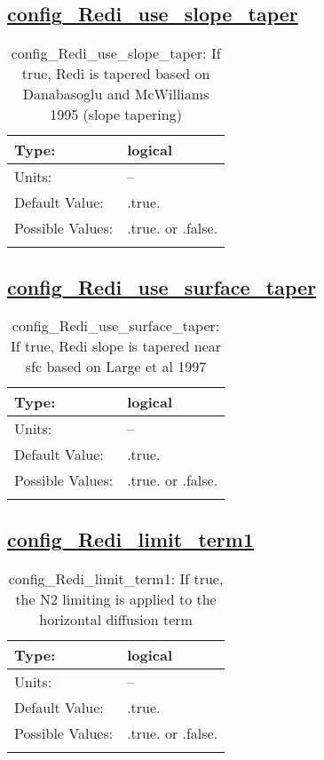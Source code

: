 \subsection[config\_Redi\_use\_slope\_taper]{\hyperref[sec:nm_tab_Redi_isopycnal_mixing]{config\_Redi\_use\_slope\_taper}}
\label{subsec:nm_sec_config_Redi_use_slope_taper}
\begin{center}
\begin{longtable}{| p{2.0in} || p{4.0in} |}
    \hline
    Type: & logical \\
    \hline
    Units: & -- \\
    \hline
    Default Value: & .true. \\
    \hline
    Possible Values: & .true. or .false. \\
    \hline
    \caption{config\_Redi\_use\_slope\_taper: If true, Redi is tapered based on Danabasoglu and McWilliams 1995 (slope tapering)}
\end{longtable}
\end{center}
\subsection[config\_Redi\_use\_surface\_taper]{\hyperref[sec:nm_tab_Redi_isopycnal_mixing]{config\_Redi\_use\_surface\_taper}}
\label{subsec:nm_sec_config_Redi_use_surface_taper}
\begin{center}
\begin{longtable}{| p{2.0in} || p{4.0in} |}
    \hline
    Type: & logical \\
    \hline
    Units: & -- \\
    \hline
    Default Value: & .true. \\
    \hline
    Possible Values: & .true. or .false. \\
    \hline
    \caption{config\_Redi\_use\_surface\_taper: If true, Redi slope is tapered near sfc based on Large et al 1997}
\end{longtable}
\end{center}
\subsection[config\_Redi\_limit\_term1]{\hyperref[sec:nm_tab_Redi_isopycnal_mixing]{config\_Redi\_limit\_term1}}
\label{subsec:nm_sec_config_Redi_limit_term1}
\begin{center}
\begin{longtable}{| p{2.0in} || p{4.0in} |}
    \hline
    Type: & logical \\
    \hline
    Units: & -- \\
    \hline
    Default Value: & .true. \\
    \hline
    Possible Values: & .true. or .false. \\
    \hline
    \caption{config\_Redi\_limit\_term1: If true, the N2 limiting is applied to the horizontal diffusion term}
\end{longtable}
\end{center}
